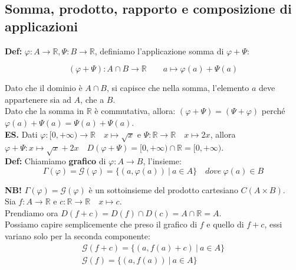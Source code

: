 \documentclass{article}
\begin{document}
\subsection{Somma, prodotto, rapporto e composizione di applicazioni}
\textbf{Def:} $\varphi: A \xrightarrow{} \mathbb{R}, \Psi: B \xrightarrow{} \mathbb{R}$, definiamo l'applicazione somma di $\varphi + \Psi$: 

\begin{equation*}
    (\varphi + \Psi): A \cap B \xrightarrow{} \mathbb{R} \qquad a \longmapsto \varphi(a) + \Psi(a)
\end{equation*}

\noindent Dato che il dominio è $A \cap B$, si capisce che nella somma, l'elemento $a$ deve appartenere sia ad $A$, che a $B$. \\

\noindent Dato che la somma in $\mathbb{R}$ è commutativa, allora: $(\varphi + \Psi) = (\Psi + \varphi)$ perché $\varphi(a) + \Psi(a) = \Psi(a) + \Psi(a)$.\\

\noindent\textbf{ES.} Dati $\varphi: [0, + \infty) \xrightarrow{} \mathbb{R} \quad x \longmapsto \sqrt{x}$ e $\Psi: \mathbb{R} \xrightarrow{} \mathbb{R} \quad x \longmapsto 2x$, allora $\varphi + \Psi: x \longmapsto \sqrt{x} + 2x \quad D(\varphi + \Psi) = [0, +\infty) \cap \mathbb{R} = [0, +\infty)$. \\

\noindent\textbf{Def:} Chiamiamo \textbf{grafico} di $\varphi: A \xrightarrow{} B$, l'insieme:
\begin{equation*}
    \Gamma(\varphi) = \mathcal{G}(\varphi) = \{(a, \varphi(a)) \ | \ a \in A\} \quad dove \ \varphi(a) \in B
\end{equation*}

\noindent\textbf{NB!} $\Gamma(\varphi) = \mathcal{G}(\varphi)$ è un sottoinsieme del prodotto cartesiano $C(A\times B)$. \\

\noindent Sia $f: A \xrightarrow{} \mathbb{R}$ e $c: \mathbb{R} \xrightarrow{} \mathbb{R} \quad x \longmapsto c$. \\
\noindent Prendiamo ora $D(f + c) = D(f) \cap D(c) = A \cap \mathbb{R} = A$. \\
\noindent Possiamo capire semplicemente che preso il grafico di $f$ e quello di $f + c$, essi variano solo per la seconda componente:
\begin{gather*}
    \mathcal{G}(f + c) = \{(a, f(a) + c) \ | \ a \in A\}\\
    \mathcal{G}(f) = \{(a, f(a)) \ | \ a \in A\}
\end{gather*}
\end{document}
